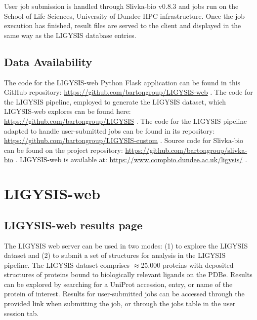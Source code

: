 

User job submission is handled through Slivka-bio v0.8.3 \cite{WAROWNY_2021_SLIVKA, SLIVKA_BIO} and jobs run on the School of Life Sciences, University of Dundee HPC infrastructure. Once the job execution has finished, result files are served to the client and displayed in the same way as the LIGYSIS database entries.

\subsection{Data Availability}

The code for the LIGYSIS-web Python Flask application can be found in this GitHub repository: \url{https://github.com/bartongroup/LIGYSIS-web} \cite{UTGES_2024_LIGYSIS_WEB_ZENODO}. The code for the LIGYSIS pipeline, employed to generate the LIGYSIS dataset, which LIGYSIS-web explores can be found here: \url{https://github.com/bartongroup/LIGYSIS} \cite{UTGES_2024_LIGYSIS_ZENODO}. The code for the LIGYSIS pipeline adapted to handle user-submitted jobs can be found in its repository: \url{https://github.com/bartongroup/LIGYSIS-custom} \cite{UTGES_2024_LIGYSIS_CUSTOM_ZENODO}. Source code for Slivka-bio can be found on the project repository:  \url{https://github.com/bartongroup/slivka-bio} \cite{MACGOWAN_2020_DRSASP}. LIGYSIS-web is available at: \url{https://www.compbio.dundee.ac.uk/ligysis/} \cite{LIGYSIS_SERVER}.

\section{LIGYSIS-web}

\subsection{LIGYSIS-web results page}

The LIGYSIS web server can be used in two modes: (1) to explore the LIGYSIS dataset and (2) to submit a set of structures for analysis in the LIGYSIS pipeline. The LIGYSIS dataset comprises $\approx$25,000 proteins with deposited structures of proteins bound to biologically relevant ligands on the PDBe. Results can be explored by searching for a UniProt accession, entry, or name of the protein of interest. Results for user-submitted jobs can be accessed through the provided link when submitting the job, or through the jobs table in the user session tab.

